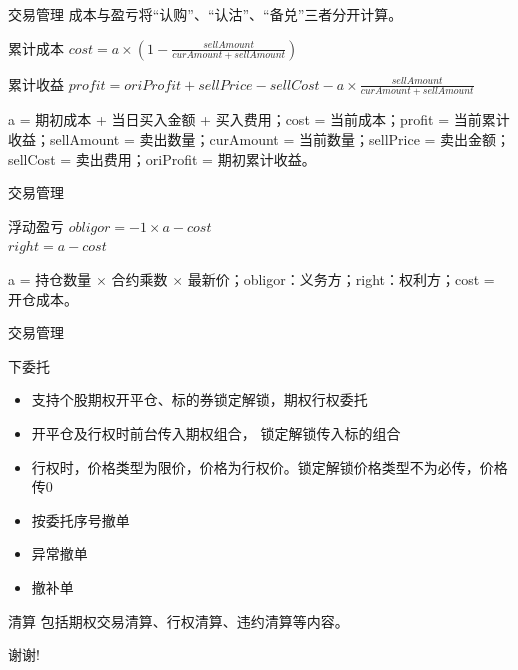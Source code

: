 \documentclass[12pt]{ctexbeamer}	%
\begin{document}
\begin{frame}{交易管理}
  成本与盈亏将“认购”、“认沽”、“备兑”三者分开计算。
  \begin{block}{累计成本}
    \large{$cost = a \times (1 - \frac{sellAmount}{curAmount + sellAmount})$}\\
  \end{block}
  \begin{block}{累计收益}
    \large{$profit = oriProfit + sellPrice - sellCost - a \times \frac{sellAmount}{curAmount + sellAmount}$}
  \end{block}
  a = 期初成本 + 当日买入金额 + 买入费用；cost = 当前成本；profit = 当前累计收益；sellAmount = 卖出数量；curAmount = 当前数量；sellPrice = 卖出金额；sellCost = 卖出费用；oriProfit = 期初累计收益。
\end{frame}

\begin{frame}{交易管理}
  \begin{block}{浮动盈亏}
    \large{$obligor = -1 \times a - cost$\\}
    \large{$right = a - cost$}
  \end{block}
  a = 持仓数量 $\times$ 合约乘数 $\times$ 最新价；obligor：义务方；right：权利方；cost = 开仓成本。
\end{frame}

\begin{frame}{交易管理}
  \begin{block}{下委托}
    \begin{itemize}
      \item 支持个股期权开平仓、标的券锁定解锁，期权行权委托
      \item 开平仓及行权时前台传入期权组合， 锁定解锁传入标的组合
      \item 行权时，价格类型为限价，价格为行权价。锁定解锁价格类型不为必传，价格传0
    \end{itemize}
  \end{block}
  \begin{itemize}
    \item 按委托序号撤单
    \item 异常撤单
    \item 撤补单
  \end{itemize}
\end{frame}

\begin{frame}{清算}
  包括期权交易清算、行权清算、违约清算等内容。\\
\end{frame}


\begin{frame}
\centerline{\Large 谢谢!}
\end{frame}
\end{document}
